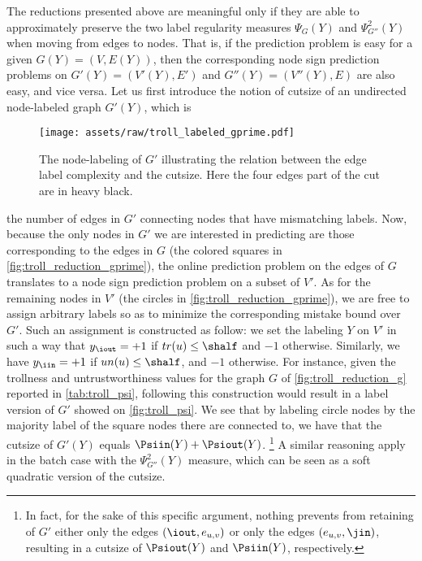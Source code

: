 The reductions presented above are meaningful only if they are able to approximately preserve the
two label regularity measures $\Psi_G(Y)$ and $\Psi^2_{G''}(Y)$ when moving from edges to nodes.
That is, if the \esp{} prediction problem is
easy for a given $G(Y) = (V,E(Y))$, then the corresponding node sign prediction problems on $G'(Y)
= (V'(Y),E')$ and $G''(Y) = (V''(Y),E)$ are also easy, and vice versa.
Let us first introduce the notion of cutsize of an undirected node-labeled graph $G'(Y)$, which is
\begin{wrapfigure}{o}[10mm]{45mm}
	\centering
	\texttt{[image: assets/raw/troll\_labeled\_gprime.pdf]}
	\caption{\small The node-labeling of $G'$ illustrating the relation between the edge label
	  complexity and the cutsize. Here the four edges part of the cut are in heavy black.
	\label{fig:troll_psi}}
\end{wrapfigure}
the number of edges in $G'$ connecting nodes that have mismatching labels.
  Now, because the only nodes in $G'$ we are
  interested in predicting are those corresponding to the edges in $G$ (the colored squares in
  \autoref{fig:troll_reduction_gprime}), the online prediction problem on the edges of $G$ translates to a node
  sign prediction problem on a subset of $V'$. As for the remaining nodes in $V'$ (the circles in
  \autoref{fig:troll_reduction_gprime}), we are free to assign arbitrary labels so as to minimize the corresponding mistake
  bound over $G'$. Such an assignment is constructed as follow: we set the labeling $Y$ on $V'$ in such a
  way that $y_{\iout} = +1$ if $tr(u) \leq \shalf$ and $-1$ otherwise. Similarly, we have $y_{\iin} = +1$ if
  $un(u) \leq \shalf$,
  and $-1$ otherwise. For instance, given the trollness and untrustworthiness values for the graph $G$ of
  \autoref{fig:troll_reduction_g} reported in \autoref{tab:troll_psi}, following this construction
  would result in a label version of $G'$ showed on \autoref{fig:troll_psi}.
  We see that by labeling circle nodes by the majority label of the square nodes there are connected
  to, we have that the cutsize of $G'(Y)$ equals  $\Psiin(Y) + \Psiout(Y)$.%
  \footnote{In fact, for the sake of
  this specific argument, nothing prevents from retaining of $G'$ either only the edges
  $(\iout,e_{u,v})$ or only the edges $(e_{u,v},\jin)$, resulting in a cutsize of $\Psiout(Y)$ and
  $\Psiin(Y)$, respectively.}
  A similar reasoning apply in the batch case with the $\Psi^2_{G''}(Y)$ measure, which can be seen
  as a soft quadratic version of the cutsize.

